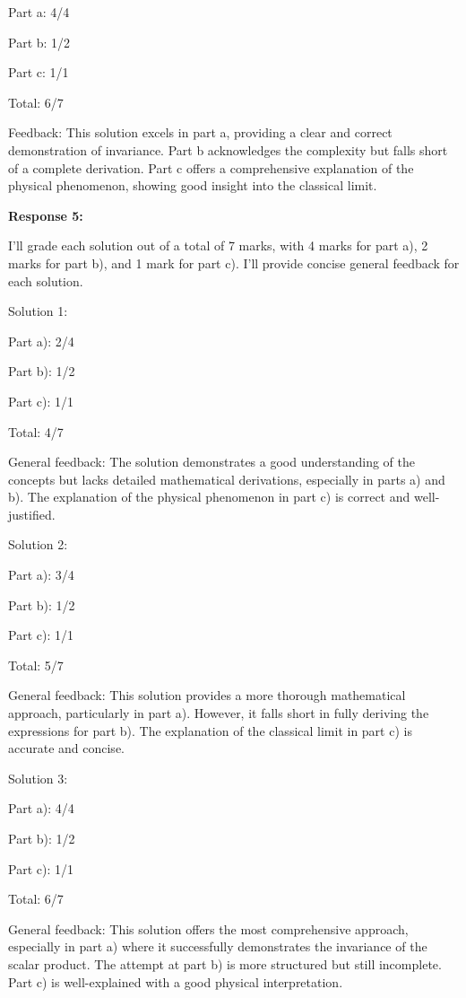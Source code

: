\documentclass[a4paper,11pt]{article}
\begin{document}
Part a: 4/4

Part b: 1/2

Part c: 1/1

Total: 6/7

Feedback: This solution excels in part a, providing a clear and correct demonstration of invariance. Part b acknowledges the complexity but falls short of a complete derivation. Part c offers a comprehensive explanation of the physical phenomenon, showing good insight into the classical limit.

\bigskip
\textbf{Response 5:}

I'll grade each solution out of a total of 7 marks, with 4 marks for part a), 2 marks for part b), and 1 mark for part c). I'll provide concise general feedback for each solution.

Solution 1:

Part a): 2/4

Part b): 1/2

Part c): 1/1

Total: 4/7

General feedback: The solution demonstrates a good understanding of the concepts but lacks detailed mathematical derivations, especially in parts a) and b). The explanation of the physical phenomenon in part c) is correct and well-justified.

Solution 2:

Part a): 3/4

Part b): 1/2

Part c): 1/1

Total: 5/7

General feedback: This solution provides a more thorough mathematical approach, particularly in part a). However, it falls short in fully deriving the expressions for part b). The explanation of the classical limit in part c) is accurate and concise.

Solution 3:

Part a): 4/4

Part b): 1/2

Part c): 1/1

Total: 6/7

General feedback: This solution offers the most comprehensive approach, especially in part a) where it successfully demonstrates the invariance of the scalar product. The attempt at part b) is more structured but still incomplete. Part c) is well-explained with a good physical interpretation.
\end{document}
